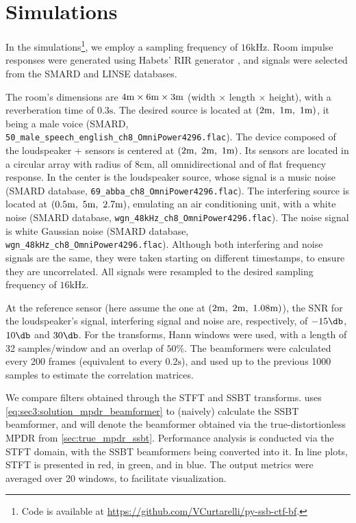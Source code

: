 
\section{Simulations}
\label{sec:results}

In the simulations\footnote{Code is available at \url{https://github.com/VCurtarelli/py-ssb-ctf-bf}.}, we employ a sampling frequency of $16\si{\kilo\hertz}$. Room impulse responses were generated using Habets' RIR generator \cite{habets_rir-generator}, and signals were selected from the SMARD \cite{smard_database} and LINSE \cite{linse_database} databases.

The room's dimensions are $4\si{\meter} \times 6\si{\meter} \times 3\si{\meter}$ (width $\times$ length $\times$ height), with a reverberation time of $0.3\si{\second}$. The desired source is located at $(2\si{\meter},~1\si{\meter},~1\si{\meter})$, it being a male voice (SMARD, \texttt{50\_male\_speech\_english\_ch8\_OmniPower4296.flac}).
%
The device composed of the loudspeaker + sensors is centered at $(2\si{\meter},~2\si{\meter},~1\si{\meter})$. Its sensors are located in a circular array with radius of $8\si{\centi\meter}$, all omnidirectional and of flat frequency response. In the center is the loudspeaker source, whose signal is a music noise (SMARD database, \texttt{69\_abba\_ch8\_OmniPower4296.flac}). The interfering source is located at $(0.5\si{\meter},~5\si{\meter},~2.7\si{\meter})$, emulating an air conditioning unit, with a white noise (SMARD database, \texttt{wgn\_48kHz\_ch8\_OmniPower4296.flac}). The noise signal is white Gaussian noise (SMARD database, \texttt{wgn\_48kHz\_ch8\_OmniPower4296.flac}). Although both interfering and noise signals are the same, they were taken starting on different timestamps, to ensure they are uncorrelated. All signals were resampled to the desired sampling frequency of $16\si{\kilo\hertz}$.

At the reference sensor (here assume the one at $(2\si{\meter},~2\si{\meter},~1.08\si{\meter})$), the SNR for the loudspeaker's signal, interfering signal and noise are, respectively, of $-15\dB$, $10\dB$ and $30\dB$. For the transforms, Hann windows were used, with a length of 32 samples/window and an overlap of $50\%$. The beamformers were calculated every 200 frames (equivalent to every $0.2\si{\second}$), and used up to the previous 1000 samples to estimate the correlation matrices.

We compare filters obtained through the STFT and SSBT transforms. \nssbt{} uses \cref{eq:sec3:solution_mpdr_beamformer} to (naively) calculate the SSBT beamformer, and \nssbt{} will denote the beamformer obtained via the true-distortionless MPDR from \cref{sec:true_mpdr_ssbt}. Performance analysis is conducted via the STFT domain, with the SSBT beamformers being converted into it. In line plots, STFT is presented in red, \nssbt{} in green, and \nssbt{} in blue. The output metrics were averaged over 20 windows, to facilitate visualization.

